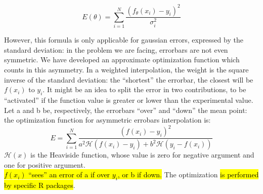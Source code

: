 $$
E(\theta)= \sum_{i=1}^{N} \frac{(f_{\theta}(x_i)-y_i)^2}{\sigma_{i}^2}
$$


However, this formula is only applicable for gaussian errors, expressed by the standard deviation: in the problem we are facing, errorbars are not even symmetric.
We have developed an approximate optimization function which counts in this asymmetry.
In a weighted interpolation, the weight is the square inverse of the standard deviation: the ``shortest'' the errorbar, the closest will be $f(x_i)$ to $y_i$.
It might be an idea to split the error in two contributions, to be ``activated'' if the function value is greater or lower than the experimental value.
Let a and b be, respectively, the errorbars ``over'' and ``down'' the mean point: the optimization function for asymmetric errobars interpolation is:
$$ E= \sum_{i=1}^{N} \frac{(f(x_i)-y_i)^2}{a^{2}\mathcal{H}(f(x_i)-y_i)+b^{2}\mathcal{H}(y_i-f(x_i))} $$
$\mathcal{H}(x)$ is the Heaviside function, whose value is zero for negative argument and one for positive argument.\\
\hl{$f(x_i)$ ``sees'' an error of a if over $y_i$, or b if down.}
 The optimization \hl{is performed by specific R packages}.
